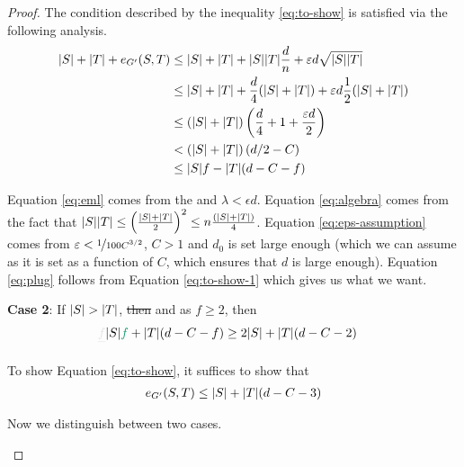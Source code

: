 \documentclass[11pt]{article}
\providecommand{\DIFadd}[1]{\textcolor{shin-ryoku}{#1}}%
\providecommand{\DIFdel}[1]{\textcolor{verylightgray}{\sout{#1}}}                      %
\providecommand{\DIFaddbegin}{} %
\providecommand{\DIFaddend}{} %
\providecommand{\DIFdelbegin}{} %
\providecommand{\DIFdelend}{} %
\begin{document}
\begin{proof}
  The condition described by the inequality \eqref{eq:to-show} is satisfied via the following analysis.
\begin{align}
  |S| + |T| + \CutEdges{S}{T}{G'} &\le  |S| + |T| + |S||T|\frac{d}{n} + \epsilon d \sqrt{\Size{S}\Size{T}} \label{eq:eml}\\
                                 &\le |S| + |T| + \frac{d}{4}(\Size{S} + \Size{T}) + \epsilon d \frac{1}{2}(\Size{S} + \Size{T}) \label{eq:algebra}\\
                                 &\le (\Size{S} + \Size{T})\left(\frac{d}{4} + 1 + \frac{
                                   \epsilon d}{2}\right) \\
                                 &<  (\Size{S} + \Size{T})\left(d/2-C\right) \label{eq:eps-assumption}\\
                                 &\le \Size{S}f - \Size{T}(d-C-f) \label{eq:plug}
 \end{align}  

Equation \eqref{eq:eml} comes from the  and $\lambda < \epsilon d$.
Equation \eqref{eq:algebra} comes from the fact that $\Size{S}\Size{T} \leq \left(\frac{\Size{S}+\Size{T}}{2}\right)^2 \le n\frac{(\Size{S}+\Size{T})}{4}$.
Equation \eqref{eq:eps-assumption} comes from $\epsilon < \nicefrac{1}{100C^{3/2}}$\DIFaddbegin \DIFadd{, $C >1$ and $d_0$ is set large enough (which we can assume as it is set as a function of $C$, which ensures that $d$ is large enough)}\DIFaddend .
Equation \eqref{eq:plug} follows from Equation \eqref{eq:to-show-1} which gives us what we want.

\textbf{Case 2}: If $\Size{S} > \Size{T}$, \DIFdelbegin \DIFdel{then 
  }\DIFdelend \DIFaddbegin \DIFadd{and as $f \ge 2$, then
  }\DIFaddend \begin{align}
    \DIFdelbegin \DIFdel{f}\DIFdelend \Size{S}\DIFaddbegin \DIFadd{f }\DIFaddend +  \Size{T}(d-C-f)  &\ge 2\Size{S} +\Size{T}(d-C-2) \label{eq:to-show-2}
  \end{align}

  To show Equation \eqref{eq:to-show}, it suffices to show that
\begin{align}
  \DIFdelbegin %
\DIFdelend \DIFaddbegin \CutEdges{S}{T}{G'} \DIFaddend \leq \Size{S} + \Size{T}(d-C-3) \label{eq:to-show-3}
\end{align}

Now we distinguish between two cases.

\begin{enumerate}


\end{enumerate}
\end{proof}
\end{document}
